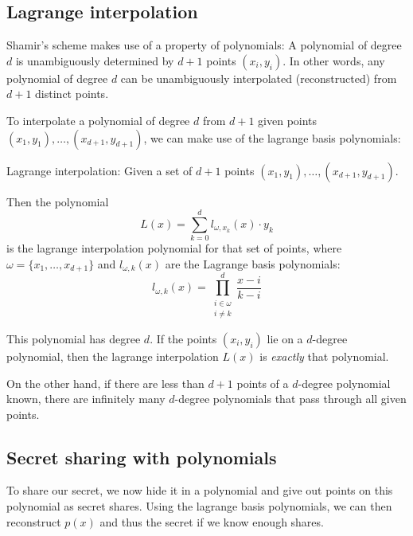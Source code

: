 \subsection{Lagrange interpolation}
Shamir's scheme makes use of a property of polynomials: A polynomial of degree $d$ is unambiguously determined by $d+1$ points $(x_i, y_i)$.
In other words, any polynomial of degree $d$ can be unambiguously interpolated (reconstructed) from $d+1$ distinct points.

To interpolate a polynomial of degree $d$ from $d+1$ given points $(x_1, y_1), \dots, (x_{d+1}, y_{d+1})$, we can make use of the lagrange basis polynomials:~\cite{yao_lightweight_2015}

\begin{definition}
    Lagrange interpolation: Given a set of $d+1$ points $(x_1, y_1), \dots, (x_{d+1}, y_{d+1})$.

    Then the polynomial 
    \begin{equation}
        L(x) = \sum_{k=0}^d l_{\omega, x_k}(x) \cdot y_k
    \end{equation}
    is the lagrange interpolation polynomial for that set of points, where $\omega = \{x_1, \dots, x_{d+1}\}$ and $l_{\omega,k}(x)$ are the Lagrange basis polynomials:
    \begin{equation}
        l_{\omega,k}(x) = \prod_{\substack{i\in\omega\\ i \neq k}}^d \frac{x-i}{k-i}
    \end{equation}
\end{definition}

This polynomial has degree $d$. If the points $(x_i, y_i)$ lie on a $d$-degree polynomial, then the lagrange interpolation $L(x)$ is \emph{exactly} that polynomial.

On the other hand, if there are less than $d+1$ points of a $d$-degree polynomial known, there are infinitely many $d$-degree polynomials that pass through all given points.~\cite{shamir_how_1979}


\subsection{Secret sharing with polynomials}
To share our secret, we now hide it in a polynomial and give out points on this polynomial as secret shares.
Using the lagrange basis polynomials, we can then reconstruct $p(x)$ and thus the secret if we know enough shares.~\cite{shamir_how_1979}

